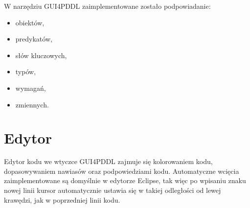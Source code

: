 W narzędziu GUI4PDDL zaimplementowane zostało podpowiadanie:
\begin{itemize}
\item obiektów,
\item predykatów,
\item słów kluczowych,
\item typów,
\item wymagań,
\item zmiennych.
\end{itemize}

\section{Edytor}
Edytor kodu we wtyczce GUI4PDDL zajmuje się kolorowaniem kodu, dopasowywaniem nawiasów oraz podpowiedziami kodu. Automatyczne wcięcia zaimplementowane są domyślnie w edytorze Eclipse, tak więc po wpisaniu znaku nowej linii kursor automatycznie ustawia się w takiej odległości od lewej krawędzi, jak w poprzedniej linii kodu.
